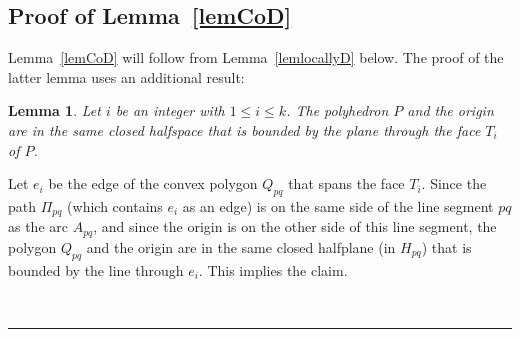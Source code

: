 \documentclass[12pt]{article}
\newtheorem{lemma}{Lemma}
\newcommand{\qed}{\rule{0.5em}{1.5ex}}
\newcommand{\fqed}{{\hfill~\qed}}
\newenvironment{proof}{{\noindent \bf Proof.}}
                      {{\hfill \fqed} \vspace{1em}}
\begin{document}
\subsection{Proof of Lemma~\ref{lemCoD}}  \label{seclemCoD}  
Lemma~\ref{lemCoD} will follow from Lemma~\ref{lemlocallyD} below.  
The proof of the latter lemma uses an additional result: 

\begin{lemma}   \label{lembelow}
Let $i$ be an integer with $1 \leq i \leq k$. The polyhedron $P$ and the 
origin are in the same closed halfspace that is bounded by the plane 
through the face $T_i$ of $P$.  
\end{lemma}
\begin{proof} 
Let $e_i$ be the edge of the convex polygon $Q_{pq}$ that spans the 
face $T_i$. Since the path $\Pi_{pq}$ (which contains $e_i$ as an edge) 
is on the same side of the line segment $pq$ as the arc $A_{pq}$, and 
since the origin is on the other side of this line segment, the polygon 
$Q_{pq}$ and the origin are in the same closed halfplane (in $H_{pq}$) 
that is bounded by the line through $e_i$. This implies the claim. 
\end{proof} 
\end{document}
